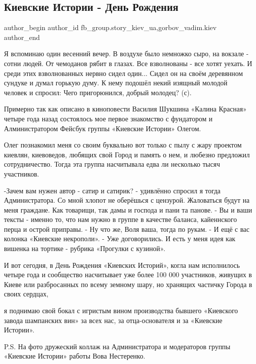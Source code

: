  
 
 
 
 
 
\subsection{Киевские Истории - День Рождения}
\label{sec:24_12_2021.fb.fb_group.story_kiev_ua.2.birthday}
 
\ifcmt
 author_begin
   author_id fb_group.story_kiev_ua,gorbov_vadim.kiev
 author_end
\fi

Я вспоминаю один весенний вечер. В воздухе было немножко сыро, на вокзале -
сотни людей. От чемоданов рябит в глазах. Все взволнованы - все хотят уехать. И
среди этих взволнованных нервно сидел один... Сидел он на своём деревянном
сундуке и думал горькую думу. К нему подошёл некий изящный молодой человек и
спросил: Чего пригорюнился, добрый молодец? (с). 


Примерно так как описано в киноповести Василия Шукшина «Калина Красная»
четыре года назад состоялось мое первое знакомство с фундатором и
Алминистратором Фейсбук группы «Киевские Истории» Олегом. 

Олег познакомил меня со своим буквально вот только с пылу с жару проектом
киевлян, киевоведов, любящих свой Город и память о нем, и любезно предложил
сотрудничество. Тогда эта группа насчитывала едва ли несколько тысяч
участников. 

-Зачем вам нужен автор -  сатир и сатирик? - удивлённо спросил я тогда
Администратора. Со мной хлопот не оберёшься с цензурой. Жаловаться будут на
меня граждане. Как товарищи, так дамы и господа и пани та панове. - Вы и
ваши тексты - именно то, что нам нужно  в группе в качестве баланса,
кайеннского перца и острой приправы. - Ну что же, Воля ваша, тогда по рукам.
- И ещё с вас колонка «Киевские некрополи». - Уже договорились. И есть у
меня идея как вишенка на тортике - рубрика «Прогулки с кузиной». 

И вот сегодня, в День Рождения «Киевских Историй», когла нам исполнилось
четыре года и сообщество насчитывает уже более 100 000 участников, живущих в
Киеве или разбросанных по всему земному шару, но хранящих частичку Города  в
своих сердцах, 

я поднимаю свой бокал с игристым вином производства бывшего  «Киевского завода
шампанских вин» за всех нас, за отца-основателя и за «Киевские Истории». 

P.S. На фото дружеский коллаж на Администратора и модераторов группы
«Киевские Истории» работы Вова Нестеренко.


